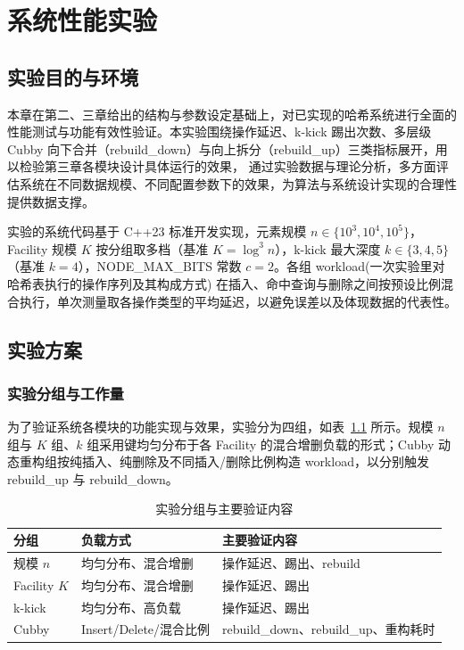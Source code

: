 \chapter{系统性能实验}
\label{ch:exp}

\section{实验目的与环境}

本章在第二、三章给出的结构与参数设定基础上，对已实现的哈希系统进行全面的性能测试与功能有效性验证。本实验围绕操作延迟、k-kick 踢出次数、多层级 Cubby 向下合并（rebuild\_down）与向上拆分（rebuild\_up）三类指标展开，用以检验第三章各模块设计具体运行的效果\cite{bender2022otsh,bender2024sosa}， 通过实验数据与理论分析，多方面评估系统在不同数据规模、不同配置参数下的效果，为算法与系统设计实现的合理性提供数据支撑。

实验的系统代码基于 C++23 标准开发实现，元素规模 \(n\in\{10^3,10^4,10^5\}\)，Facility 规模 \(K\) 按分组取多档（基准 \(K=\log^3 n\)），k-kick 最大深度 \(k\in\{3,4,5\}\)（基准 \(k=4\)），NODE\_MAX\_BITS 常数 \(c=2\)。各组 workload(一次实验里对哈希表执行的操作序列及其构成方式) 在插入、命中查询与删除之间按预设比例混合执行，单次测量取各操作类型的平均延迟，以避免误差以及体现数据的代表性。

\section{实验方案}

\subsection{实验分组与工作量}

为了验证系统各模块的功能实现与效果，实验分为四组，如表~\ref{tab:exp-plan} 所示。规模 \(n\) 组与 \(K\) 组、\(k\) 组采用键均匀分布于各 Facility 的混合增删负载的形式；Cubby 动态重构组按纯插入、纯删除及不同插入/删除比例构造 workload，以分别触发 rebuild\_up 与 rebuild\_down。

\begin{table}[htbp]
  \centering
  \caption{实验分组与主要验证内容}
  \label{tab:exp-plan}
  \small
  \begin{tabular}{p{1.6cm}p{3.6cm}p{5.8cm}}
    \toprule
    分组 & 负载方式 & 主要验证内容 \\
    \midrule
    规模 \(n\) & 均匀分布、混合增删 & 操作延迟、踢出、rebuild \\
    Facility \(K\) & 均匀分布、混合增删 & 操作延迟、踢出 \\
    k-kick & 均匀分布、高负载 & 操作延迟、踢出 \\
    Cubby & Insert/Delete/混合比例 & rebuild\_down、rebuild\_up、重构耗时 \\
    \bottomrule
  \end{tabular}
\end{table}

